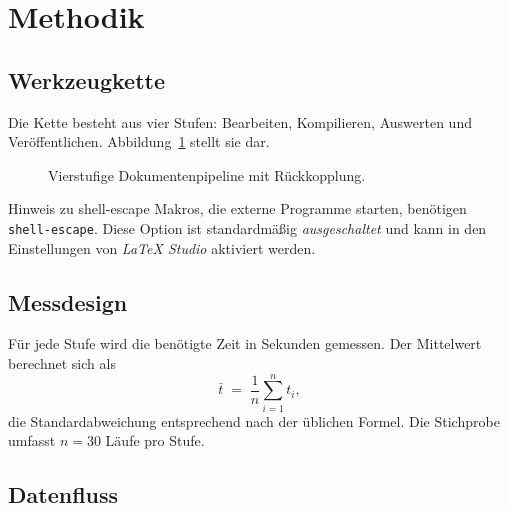 \section{Methodik}
\label{sec:methodik}

\subsection{Werkzeugkette}
\label{sec:toolchain}

Die Kette besteht aus vier Stufen: Bearbeiten, Kompilieren, Auswerten und
Veröffentlichen. Abbildung~\ref{fig:pipeline} stellt sie dar.

\begin{figure}[htbp]
  \centering
  \caption{Vierstufige Dokumentenpipeline mit Rückkopplung.}
  \label{fig:pipeline}
\end{figure}

\begin{warnung}{Hinweis zu shell-escape}
  Makros, die externe Programme starten, benötigen
  \texttt{shell-escape}. Diese Option ist standardmäßig \emph{ausgeschaltet} und
  kann in den Einstellungen von \emph{LaTeX Studio} aktiviert werden.
\end{warnung}

\subsection{Messdesign}

Für jede Stufe wird die benötigte Zeit in Sekunden gemessen. Der Mittelwert
berechnet sich als
\[
  \bar{t} \;=\; \frac{1}{n}\sum_{i=1}^{n} t_i,
\]
die Standardabweichung entsprechend nach der üblichen Formel. Die Stichprobe
umfasst $n = \num{30}$ Läufe pro Stufe.

\subsection{Datenfluss}

